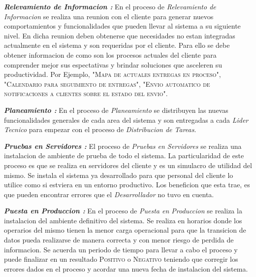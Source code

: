 \documentclass[
10pt, %
a4paper, %
oneside, %
headinclude,footinclude, %
BCOR5mm, %
]{scrartcl}
\begin{document}
  \textbf{ \emph{Relevamiento de Informacion : } } En el proceso de
  \textit{Relevamiento de Informacion} se realiza una reunion con el cliente
  para generar nuevos comportamientos y funcionalidades que pueden llevar al
  sistema a su siguiente nivel. En dicha reunion deben obtenerse que necesidades
  no estan integradas actualmente en el sistema y son requeridas por el cliente.
  Para ello se debe obtener informacion de como son los procesos actuales del
  cliente para comprender mejor sus espectativas y brindar soluciones que
  asceleren su productividad.
  Por Ejemplo,
  "\textsc{Mapa de actuales entregas en proceso}",
  "\textsc{Calendario para seguimiento de entregas}",
  "\textsc{Envio automatico de notificaciones a clientes sobre el estado del envio}".

  \textbf{ \emph{Planeamiento : } } En el proceso de \textit{Planeamiento} se
  distribuyen las nuevas funcionalidades generales de cada area del sistema y
  son entregadas a cada \textit{Lider Tecnico} para empezar con el proceso de
  \textit{Distribucion de Tareas}.

  \textbf{ \emph{Pruebas en Servidores : } } El proceso de
  \textit{Pruebas en Servidores} se realiza una instalacion de ambiente
  de prueba de todo el sistema. La particularidad de este proceso es que
  se realiza en servidores del cliente y es un simulacro de utilidad del mismo.
  Se instala el sistema ya desarrollado para que personal del cliente lo
  utilice como si estviera en un entorno productivo. Los beneficion que esta
  trae, es que pueden encontrar errores que el \textit{Desarrollador} no tuvo
  en cuenta.

  \textbf{ \emph{Puesta en Produccion : } } En el proceso de
  \textit{Puesta en Produccion} se realiza la instalacion del ambiente
  definitivo del sistema. Se realiza en horarios donde los operarios del mismo
  tienen la menor carga operacional para que la transicion de datos pueda
  realizarse de manera correcta y con menor riesgo de perdida de informacion.
  Se acuerda un periodo de tiempo para llevar a cabo el proceso y puede
  finalizar en un resultado \textsc{Positivo} o \textsc{Negativo} teniendo
  que corregir los errores dados en el proceso y acordar una nueva fecha de
  instalacion del sistema.
\end{document}
